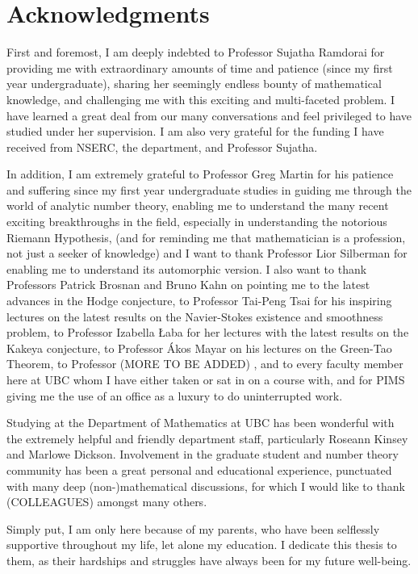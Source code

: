 
\chapter{Acknowledgments}

\tab

First and foremost, I am deeply indebted to Professor Sujatha Ramdorai for providing me with extraordinary amounts of time and patience (since my first year undergraduate), sharing her seemingly endless bounty of mathematical knowledge, and challenging me with this exciting and multi-faceted problem. I have learned a great deal from our many conversations and feel privileged to have studied under her supervision. I am also very grateful for the funding I have received from NSERC, the department, and Professor Sujatha. 

In addition, I am extremely grateful to Professor Greg Martin for his patience and suffering since my first year undergraduate studies in guiding me through the world of analytic number theory, enabling me to understand the many recent exciting breakthroughs in the field, especially in understanding the notorious Riemann Hypothesis, (and for reminding me that mathematician is a profession, not just a seeker of knowledge) and I want to thank Professor Lior Silberman for enabling me to understand its automorphic version.  I also want to thank Professors Patrick Brosnan and Bruno Kahn on pointing me to the latest advances in the Hodge conjecture, to Professor Tai-Peng Tsai for his inspiring lectures on the latest results on the Navier-Stokes existence and smoothness problem, to Professor Izabella \L aba for her lectures with the latest results on the Kakeya conjecture, to Professor {\'A}kos Mayar on his lectures on the Green-Tao Theorem, to Professor (MORE TO BE ADDED) , and to every faculty member here at UBC whom I have either taken or sat in on a course with, and for PIMS giving me the use of an office as a luxury to do uninterrupted work.

Studying at the Department of Mathematics at UBC has been wonderful with the extremely helpful and friendly department staff, particularly Roseann Kinsey and Marlowe Dickson. Involvement in the graduate student and number theory community has been a great personal and educational experience, punctuated with many deep (non-)mathematical discussions, for which I would like to thank (COLLEAGUES) amongst many others. 

Simply put, I am only here because of my parents, who have been selflessly supportive throughout my life, let alone my education. I dedicate this thesis to them, as their hardships and struggles have always been for my future well-being. 